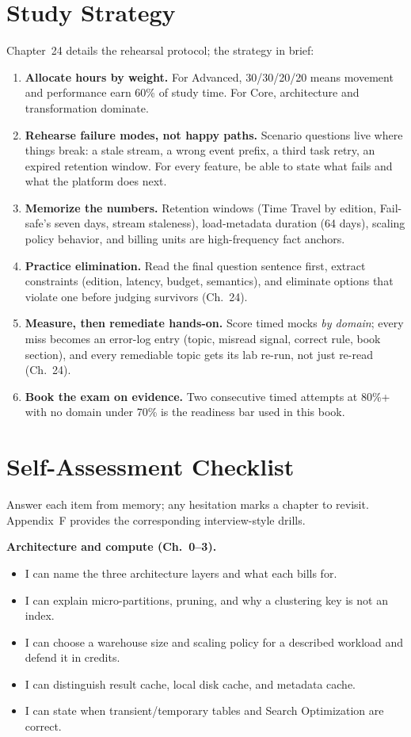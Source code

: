 \section{Study Strategy}
Chapter~24 details the rehearsal protocol; the strategy in brief:
\begin{enumerate}
    \item \textbf{Allocate hours by weight.} For Advanced, 30/30/20/20 means movement and
    performance earn 60\% of study time. For Core, architecture and transformation dominate.
    \item \textbf{Rehearse failure modes, not happy paths.} Scenario questions live where
    things break: a stale stream, a wrong event prefix, a third task retry, an expired
    retention window. For every feature, be able to state what fails and what the platform does
    next.
    \item \textbf{Memorize the numbers.} Retention windows (Time Travel by edition, Fail-safe's
    seven days, stream staleness), load-metadata duration (64 days), scaling policy behavior,
    and billing units are high-frequency fact anchors.
    \item \textbf{Practice elimination.} Read the final question sentence first, extract
    constraints (edition, latency, budget, semantics), and eliminate options that violate one
    before judging survivors (Ch.~24).
    \item \textbf{Measure, then remediate hands-on.} Score timed mocks \emph{by domain}; every
    miss becomes an error-log entry (topic, misread signal, correct rule, book section), and
    every remediable topic gets its lab re-run, not just re-read (Ch.~24).
    \item \textbf{Book the exam on evidence.} Two consecutive timed attempts at 80\%+ with no
    domain under 70\% is the readiness bar used in this book.
\end{enumerate}

\section{Self-Assessment Checklist}
Answer each item from memory; any hesitation marks a chapter to revisit. Appendix~F provides
the corresponding interview-style drills.

\textbf{Architecture and compute (Ch.~0--3).}
\begin{itemize}
    \item[$\square$] I can name the three architecture layers and what each bills for.
    \item[$\square$] I can explain micro-partitions, pruning, and why a clustering key is not an index.
    \item[$\square$] I can choose a warehouse size and scaling policy for a described workload and defend it in credits.
    \item[$\square$] I can distinguish result cache, local disk cache, and metadata cache.
    \item[$\square$] I can state when transient/temporary tables and Search Optimization are correct.
\end{itemize}

